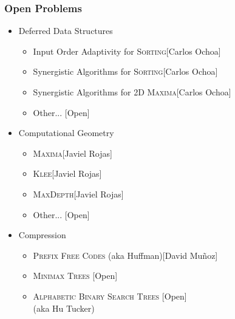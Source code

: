 \begin{frame}
\frametitle{Open Problems}
\begin{itemize}
\item Deferred Data Structures 
  \begin{itemize}
\item Input Order Adaptivity for \textsc{Sorting}\hfill [Carlos Ochoa]
\item Synergistic Algorithms  for \textsc{Sorting}\hfill [Carlos Ochoa]
\item Synergistic Algorithms  for \textsc{2D Maxima}\hfill [Carlos Ochoa]
\item Other... \hfill [\alert{Open}]
  \end{itemize}

\vfill
\item Computational Geometry
  \begin{itemize}
\item \textsc{Maxima}\hfill [Javiel Rojas]
\item \textsc{Klee}\hfill [Javiel Rojas]
\item \textsc{MaxDepth}\hfill [Javiel Rojas]
\item Other... \hfill [\alert{Open}]
  \end{itemize}
\vfill
\item Compression
  \begin{itemize}
\item \textsc{Prefix Free Codes} (aka Huffman)\hfill [David Mu{\~n}oz]
\item \textsc{Minimax Trees} \hfill [\alert{Open}]
\item \textsc{Alphabetic Binary Search Trees} \hfill [\alert{Open}] \\ (aka Hu Tucker)
  \end{itemize}
  \end{itemize}
\end{frame}


